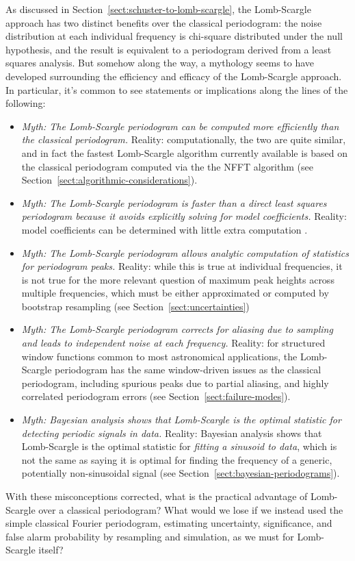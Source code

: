 \documentclass[preprint]{aastex}
\newcommand{\Sect}[1]{Section~\ref{sect:#1}}
\newcommand{\sect}[1]{\Sect{#1}}
\begin{document}
As discussed in \sect{schuster-to-lomb-scargle}, the Lomb-Scargle approach has
two distinct benefits over the classical periodogram:
the noise distribution at each individual frequency is chi-square distributed
under the null hypothesis,
and the result is equivalent to a periodogram derived
from a least squares analysis.
But somehow along the way, a mythology seems to have developed surrounding
the efficiency and efficacy of the Lomb-Scargle approach. In particular,
it's common to see statements or implications along the lines of the following:
\begin{itemize}
  \item {\it Myth: The Lomb-Scargle periodogram can be computed more efficiently
    than the classical periodogram.} Reality: computationally, the two
    are quite similar, and in fact the fastest Lomb-Scargle algorithm currently
    available is based on the classical periodogram computed via the
    the NFFT algorithm (see \sect{algorithmic-considerations}).
  \item {\it Myth: The Lomb-Scargle periodogram is faster than a direct
    least squares periodogram because it avoids explicitly solving for
    model coefficients.}
    Reality: model coefficients can be determined with little extra
    computation \citep[see the discussion in][]{ICVG2014}.
  \item {\it Myth: The Lomb-Scargle periodogram allows analytic computation of
    statistics for periodogram peaks.} Reality: while this is true at
    individual frequencies, it is not true for the more relevant question of
    maximum peak heights across multiple frequencies,
    which must be either approximated
    or computed by bootstrap resampling (see \sect{uncertainties})
  \item {\it Myth: The Lomb-Scargle periodogram corrects for aliasing due to
    sampling and leads to independent noise at each frequency.}
    Reality: for structured window functions common to most astronomical
    applications, the Lomb-Scargle
    periodogram has the same window-driven issues as the classical
    periodogram, including spurious peaks due to partial aliasing, and
    highly correlated periodogram errors (see \sect{failure-modes}).
  \item {\it Myth: Bayesian analysis shows that Lomb-Scargle is the optimal
    statistic for detecting periodic signals in data.} Reality: Bayesian
    analysis shows that Lomb-Scargle is the optimal statistic for
    {\it fitting a sinusoid to data}, which is not the same as saying it
    is optimal for finding the frequency of a generic, potentially
    non-sinusoidal signal (see \sect{bayesian-periodograms}).
\end{itemize}
With these misconceptions corrected, what is the practical advantage of
Lomb-Scargle over a classical periodogram?
What would we lose if we instead used the simple classical Fourier periodogram,
estimating uncertainty, significance, and false alarm probability by
resampling and simulation, as we must for Lomb-Scargle itself?
\end{document}
